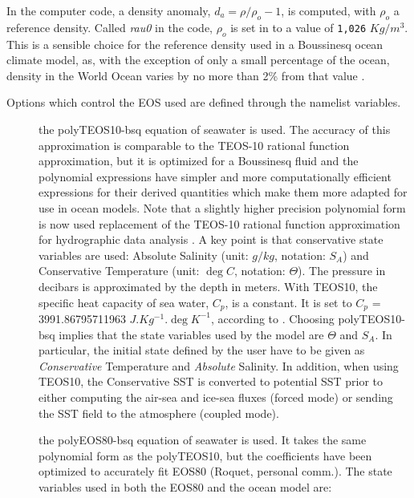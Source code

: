 \documentclass[../main/NEMO_manual]{subfiles}
\begin{document}
In the computer code, a density anomaly, $d_a = \rho / \rho_o - 1$, is computed,
with $\rho_o$ a reference density.
Called \textit{rau0} in the code,
$\rho_o$ is set in  to a value of \texttt{1,026} $Kg/m^3$.
This is a sensible choice for the reference density used in a Boussinesq ocean climate model,
as, with the exception of only a small percentage of the ocean,
density in the World Ocean varies by no more than 2\% from that value \citep{gill_bk82}.

Options which control the EOS used are defined through the  namelist variables.

\begin{description}
\item [{}] the polyTEOS10-bsq equation of seawater
  \citep{roquet.madec.ea_OM15} is used.
  The accuracy of this approximation is comparable to the TEOS-10 rational function approximation,
  but it is optimized for a Boussinesq fluid and
  the polynomial expressions have simpler and more computationally efficient expressions for
  their derived quantities which make them more adapted for use in ocean models.
  Note that a slightly higher precision polynomial form is now used
  replacement of the TEOS-10 rational function approximation for hydrographic data analysis
  \citep{ioc.iapso_bk10}.
  A key point is that conservative state variables are used:
  Absolute Salinity (unit: $g/kg$, notation: $S_A$) and
  Conservative Temperature (unit: $\deg{C}$, notation: $\Theta$).
  The pressure in decibars is approximated by the depth in meters.
  With TEOS10, the specific heat capacity of sea water, $C_p$, is a constant.
  It is set to $C_p$ = 3991.86795711963 $J.Kg^{-1}.\deg{K}^{-1}$,
  according to \citet{ioc.iapso_bk10}.
  Choosing polyTEOS10-bsq implies that the state variables used by the model are $\Theta$ and $S_A$.
  In particular, the initial state defined by the user have to be given as
  \textit{Conservative} Temperature and \textit{Absolute} Salinity.
  In addition, when using TEOS10, the Conservative SST is converted to potential SST prior to
  either computing the air-sea and ice-sea fluxes (forced mode) or
  sending the SST field to the atmosphere (coupled mode).
\item [{}] the polyEOS80-bsq equation of seawater is used.
  It takes the same polynomial form as the polyTEOS10,
  but the coefficients have been optimized to accurately fit EOS80 (Roquet, personal comm.).
  The state variables used in both the EOS80 and the ocean model are:

\end{description}
\end{document}
